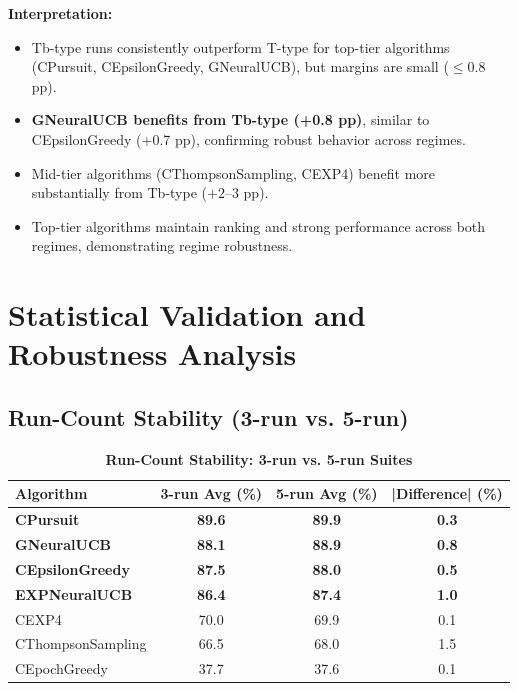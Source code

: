 \documentclass[12pt,a4paper]{article}
\newcommand{\success}[1]{\textcolor{successcolor}{\textbf{#1}}}
\newcommand{\legacy}[1]{\textcolor{legacycolor}{\textbf{#1}}}
\newcommand{\neural}[1]{\textcolor{neuralcolor}{\textbf{#1}}}
\begin{document}
\textbf{Interpretation:}
\begin{itemize}
\item Tb-type runs consistently outperform T-type for top-tier algorithms (CPursuit, CEpsilonGreedy, GNeuralUCB), but margins are small ($\leq$0.8 pp).
\item \neural{GNeuralUCB benefits from Tb-type (+0.8 pp)}, similar to CEpsilonGreedy (+0.7 pp), confirming robust behavior across regimes.
\item Mid-tier algorithms (CThompsonSampling, CEXP4) benefit more substantially from Tb-type ($+2$--3 pp).
\item Top-tier algorithms maintain ranking and strong performance across both regimes, demonstrating regime robustness.
\end{itemize}

\section{Statistical Validation and Robustness Analysis}

\subsection{Run-Count Stability (3-run vs. 5-run)}

\begin{table}[H]
\centering
\caption{\success{Run-Count Stability: 3-run vs. 5-run Suites}}
\begin{tabular}{|l|c|c|c|}
\hline
\textbf{Algorithm} & \textbf{3-run Avg (\%)} & \textbf{5-run Avg (\%)} & \textbf{|Difference| (\%)} \\
\hline
\hline
\success{CPursuit}        & \success{89.6} & \success{89.9} & \success{0.3} \\
\neural{GNeuralUCB}       & \neural{88.1} & \neural{88.9} & \neural{0.8} \\
\success{CEpsilonGreedy} & \success{87.5} & \success{88.0} & \success{0.5} \\
\legacy{EXPNeuralUCB}    & \legacy{86.4} & \legacy{87.4} & \legacy{1.0} \\
CEXP4                    & 70.0          & 69.9          & 0.1 \\
CThompsonSampling        & 66.5          & 68.0          & 1.5 \\
CEpochGreedy             & 37.7          & 37.6          & 0.1 \\
\hline
\end{tabular}
\end{table}
\end{document}
